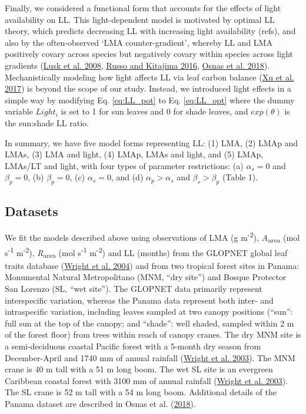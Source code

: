 \documentclass[
  12pt,
  a4paper,
,tablecaptionabove
]{scrartcl}
\begin{document}
Finally, we considered a functional form that accounts for the effects
of light availability on LL. This light-dependent model is motivated by
optimal LL theory, which predicts decreasing LL with increasing light
availability (refs), and also by the often-observed `LMA
counter-gradient', whereby LL and LMA positively covary across species
but negatively covary within species across light gradients
(\protect\hyperlink{ref-Lusk2008}{Lusk et al. 2008},
\protect\hyperlink{ref-Russo2016}{Russo and Kitajima 2016},
\protect\hyperlink{ref-Osnas2018}{Osnas et al. 2018}). Mechanistically
modeling how light affects LL via leaf carbon balance
(\protect\hyperlink{ref-Xu2017}{Xu et al. 2017}) is beyond the scope of
our study. Instead, we introduced light effects in a simple way by
modifying Eq. \ref{eq:LL_pot} to Eq. \ref{eq:LL_opt} where the dummy
variable \(Light_i\) is set to 1 for sun leaves and 0 for shade leaves,
and \(exp(\theta)\) is the sun:shade LL ratio.

In summary, we have five model forms representing LL: (1) LMA, (2) LMAp
and LMAs, (3) LMA and light, (4) LMAp, LMAs and light, and (5) LMAp,
LMAs/LT and light, with four types of parameter restrictions: (a)
\(\alpha_s = 0\) and \(\beta_p = 0\), (b) \(\beta_p = 0\), (c)
\(\alpha_s = 0\), and (d) \(\alpha_p > \alpha_s\) and
\(\beta_s > \beta_p\) (Table 1).

\hypertarget{datasets}{%
\subsection{Datasets}\label{datasets}}

We fit the models described above using observations of LMA (g
m\textsuperscript{-2}), \emph{A}\textsubscript{area} (mol
s\textsuperscript{-1} m\textsuperscript{-2}),
\emph{R}\textsubscript{area} (mol s\textsuperscript{-1}
m\textsuperscript{-2}) and LL (months) from the GLOPNET global leaf
traits database (\protect\hyperlink{ref-Wright2004a}{Wright et al.
2004}) and from two tropical forest sites in Panama: Monumental Natural
Metropolitano (MNM, ``dry site'') and Bosque Protector San Lorenzo (SL,
``wet site''). The GLOPNET data primarily represent interspecific
variation, whereas the Panama data represent both inter- and
intraspecific variation, including leaves sampled at two canopy
positions (``sun'': full sun at the top of the canopy; and ``shade'':
well shaded, sampled within 2 m of the forest floor) from trees within
reach of canopy cranes. The dry MNM site is a semi-deciduous coastal
Pacific forest with a 5-month dry season from December-April and 1740 mm
of annual rainfall (\protect\hyperlink{ref-Wright2003}{Wright et al.
2003}). The MNM crane is 40 m tall with a 51 m long boom. The wet SL
site is an evergreen Caribbean coastal forest with 3100 mm of annual
rainfall (\protect\hyperlink{ref-Wright2003}{Wright et al. 2003}). The
SL crane is 52 m tall with a 54 m long boom. Additional details of the
Panama dataset are described in Osnas et al.
(\protect\hyperlink{ref-Osnas2018}{2018}).
\end{document}

